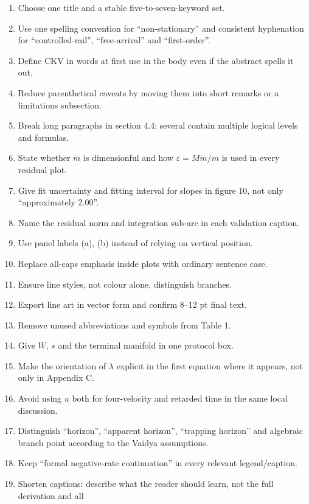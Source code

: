 \documentclass[11pt,a4paper]{article}
\begin{document}
\begin{enumerate}[label=\textbf{m\arabic*.}]
  \item Choose one title and a stable five-to-seven-keyword set.
  \item Use one spelling convention for ``non-stationary'' and consistent hyphenation for
  ``controlled-rail'', ``free-arrival'' and ``first-order''.
  \item Define CKV in words at first use in the body even if the abstract spells it out.
  \item Reduce parenthetical caveats by moving them into short remarks or a limitations subsection.
  \item Break long paragraphs in section 4.4; several contain multiple logical levels and formulas.
  \item State whether $\dot m$ is dimensionful and how $\varepsilon=M\dot m/m$ is used in every
  residual plot.
  \item Give fit uncertainty and fitting interval for slopes in figure 10, not only ``approximately
  2.00''.
  \item Name the residual norm and integration sub-arc in each validation caption.
  \item Use panel labels (a), (b) instead of relying on vertical position.
  \item Replace all-caps emphasis inside plots with ordinary sentence case.
  \item Ensure line styles, not colour alone, distinguish branches.
  \item Export line art in vector form and confirm 8--12 pt final text.
  \item Remove unused abbreviations and symbols from Table 1.
  \item Give $W$, $s$ and the terminal manifold in one protocol box.
  \item Make the orientation of $\lambda$ explicit in the first equation where it appears, not only
  in Appendix C.
  \item Avoid using $u$ both for four-velocity and retarded time in the same local discussion.
  \item Distinguish ``horizon'', ``apparent horizon'', ``trapping horizon'' and algebraic branch
  point according to the Vaidya assumptions.
  \item Keep ``formal negative-rate continuation'' in every relevant legend/caption.
  \item Shorten captions: describe what the reader should learn, not the full derivation and all

\end{enumerate}
\end{document}
